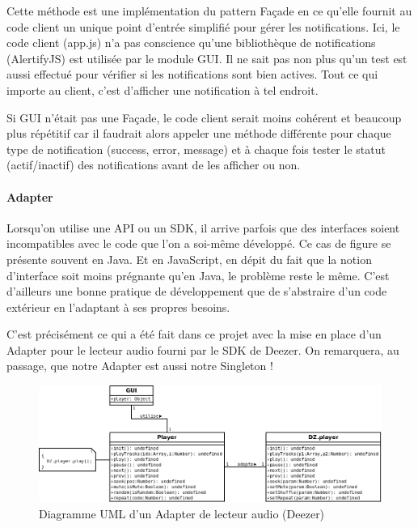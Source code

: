 \documentclass[a4paper,12pt]{article}
\begin{document}
Cette méthode est une implémentation du pattern Façade en ce qu'elle fournit au code client un unique point d'entrée simplifié pour gérer les notifications. Ici, le code client (app.js) n'a pas conscience qu'une bibliothèque de notifications (AlertifyJS) est utilisée par le module GUI. Il ne sait pas non plus qu'un test est aussi effectué pour vérifier si les notifications sont bien actives. Tout ce qui importe au client, c'est d'afficher une notification à tel endroit.

Si GUI n'était pas une Façade, le code client serait moins cohérent et beaucoup plus répétitif car il faudrait alors appeler une méthode différente pour chaque type de notification (success, error, message) et à chaque fois tester le statut (actif/inactif) des notifications avant de les afficher ou non.

\paragraph{Adapter}

Lorsqu'on utilise une API ou un SDK, il arrive parfois que des interfaces soient incompatibles avec le code que l'on a soi-même développé. Ce cas de figure se présente souvent en Java. Et en JavaScript, en dépit du fait que la notion d'interface soit moins prégnante qu'en Java, le problème reste le même. C'est d'ailleurs une bonne pratique de développement que de s'abstraire d'un code extérieur en l'adaptant à ses propres besoins.

C'est précisément ce qui a été fait dans ce projet avec la mise en place d'un Adapter pour le lecteur audio fourni par le SDK de Deezer. On remarquera, au passage, que notre Adapter est aussi notre Singleton !

\begin{figure}[!h]
  \begin{center}
    \includegraphics[scale=0.4]{Adapter.png}
    \caption{Diagramme UML d'un Adapter de lecteur audio (Deezer)}
  \end{center}
\end{figure}
\end{document}
